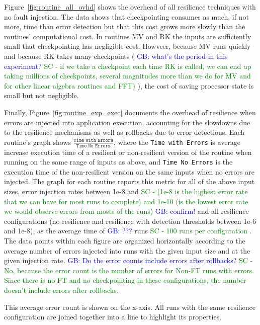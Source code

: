 \documentclass{sig-alternate}
\newcommand{\sui}[1]{%
  \textcolor{green}{SC - #1}
}
\newcommand{\greg}[1]{%
  \textcolor{blue}{GB: #1}
}
\begin{document}
Figure~\ref{fig:routine_all_ovhd} shows the overhead of all resilience techniques with no fault injection.
The data shows that checkpointing consumes as much, if not more, time than error detection but that this cost grows more slowly than the routines' computational cost.
In routines MV and RK the inputs are sufficiently small that checkpointing has negligible cost.
Howveer, because MV runs quickly and because RK takes many checkpoints (\greg{what's the period in this experiment?} \sui{if we take a checkpoint each time RK is called, we can end up taking millions of checkpoints, several magnitudes more than we do for MV and for other linear algebra routines and FFT)}), the cost of saving processor state is small but not negligible.

Finally, Figure~\ref{fig:routine_exp_exec} documents the overhead of resilience when errors are injected into application execution, accounting for the slowdowns due to the resilience mechanisms as well as rollbacks due to error detections.
Each routine's graph shows $\frac{\texttt{Time with Errors}}{\texttt{Time No Errors}}$, where the \texttt{Time with Errors} is average increase execution time of a resilient or non-resilient version of the routine when running on the same range of inputs as above, and \texttt{Time No Errors} is the execution time of the non-resilient version on the same inputs when no errors are injected.
The graph for each routine reports this metric for all of the above input sizes, error injection rates between 1e-8 and \sui{(1e-8 is the highest error rate that we can have for most runs to complete) and 1e-10 (is the lowest error rate we would observe errors from mosts of the runs) } \greg{confirm!} and all resilience configurations (no resilience and resilience with detection thresholds between 1e-6 and 1e-8), as the average time of \greg{???} runs \sui{100 runs per configuration}.
The data points within each figure are organized horizontally according to the average number of errors injected into runs with the given input size and at the given injection rate. \greg{Do the error counts include errors after rollbacks?} \sui{No, because the error count is the number of errors for Non-FT runs with errors. Since there is no FT and no checkpointing in these configurations, the number doesn't include errors after rollbacks. }
This average error count is shown on the x-axis.
All runs with the same resilience configuration are joined together into a line to highlight its properties.
\end{document}
